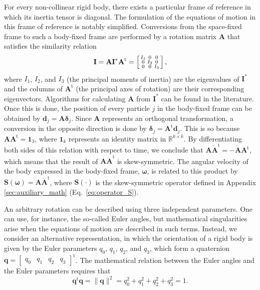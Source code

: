 \documentclass[aip,jcp,reprint,amsmath,amssymb]{revtex4-1}
\makeatletter
\newcommand{\mt}[1]{\boldsymbol{\mathbf{#1}}}           %
\newcommand{\vt}[1]{\boldsymbol{\mathbf{#1}}}           %
\newcommand{\tr}[1]{#1^\text{t}}                        %
\newenvironment{smallarray}[1]                          %
{\null\,\vcenter\bgroup\scriptsize
	\renewcommand{\arraystretch}{0.7}
	\arraycolsep=.13885em
	\hbox\bgroup$\array{@{}#1@{}}}
{\endarray$\egroup\egroup\,\null}
\makeatother
\begin{document}
For every non-collinear rigid body, there exists a particular frame of reference in which its inertia tensor is diagonal. The formulation of the equations of motion in this frame of reference is notably simplified. Conversions from the space-fixed frame to such a body-fixed frame are performed by a rotation matrix $\mt A$ that satisfies the similarity relation\cite{Goldstein2002}
\[
{\mt I} = {\mt A} {\mt I}^\ast \tr{\mt A} = \left[ \begin{smallarray}{ccc}
I_1 &   0 &   0 \\
  0 & I_2 &   0 \\
  0 &   0 & I_3 \\
\end{smallarray} \right],
\]
where $I_1$, $I_2$, and $I_3$ (the principal moments of inertia) are the eigenvalues of ${\mt I}^\ast$ and the columns of $\tr{\mt A}$ (the principal axes of rotation) are their corresponding eigenvectors. Algorithms for calculating $\mt A$ from $\mt I^\ast$ can be found in the literature.\cite{Kopp2008} Once this is done, the position of every particle $j$ in the body-fixed frame can be obtained by ${\vt d}_j = {\mt A} {\vt \delta}_j$. Since $\mt A$ represents an orthogonal transformation, a conversion in the opposite direction is done by ${\vt \delta}_j = \tr{\mt A} {\vt d}_j$.\cite{Goldstein2002} This is so because $\mt A \tr{\mt A} = \mt 1_3$, where $\mt 1_k$ represents an identity matrix in $\mathbb{R}^{k \times k}$. By differentiating both sides of this relation with respect to time, we conclude that ${\mt A} \tr{\dot{\mt A}} = -\dot{\mt A} \tr{\mt A}$, which means that the result of $\mt A \tr{\dot{\mt A}}$ is skew-symmetric. The angular velocity of the body expressed in the body-fixed frame, $\vt \omega$, is related to this product by $\mt S(\vt \omega) = \mt A \tr{\dot{\mt A}}$,\cite{Haug1989} where $\mt S(\cdot)$ is the skew-symmetric operator defined in Appendix \ref{sec:auxiliary_math}  (Eq.~\ref{eq:operator_S}).

An arbitrary rotation can be described using three independent parameters. One can use, for instance, the so-called Euler angles, but mathematical singularities arise when the equations of motion are described in such terms. Instead, we consider an alternative representation, in which the orientation of a rigid body is given by the Euler parameters $q_0$, $q_1$, $q_2$, and $q_3$, which form a quaternion $\vt q = \tr {[\begin{array}{cccc} q_0 & q_1 & q_2 & q_3 \end{array}]}$. The mathematical relation between the Euler angles and the Euler parameters requires that\cite{Goldstein2002}
\begin{equation}
\label{eq:norm_eq_1}
\tr{\vt q}{\vt q} = \|\vt q\|^2 = q_0^2 + q_1^2 + q_2^2 + q_3^2 = 1.
\end{equation}
\end{document}
